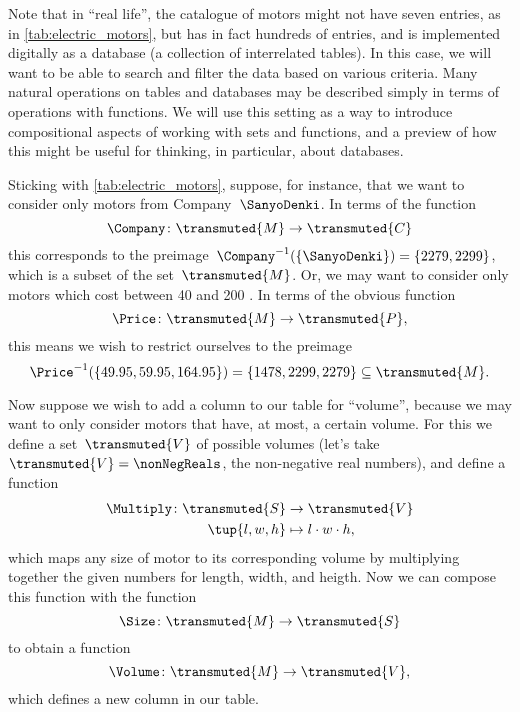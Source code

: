 Note that in ``real life'', the catalogue of motors might not have seven entries, as in \cref{tab:electric_motors}, but has in fact hundreds of entries, and is implemented digitally as a database (a collection of interrelated tables). In this case, we will want to be able to search and filter the data based on various criteria. Many natural operations on tables and databases may be described simply in terms of operations with functions. We will use this setting as a way to introduce compositional aspects of working with sets and functions, and a preview of how this might be useful for thinking, in particular, about databases.

Sticking with \cref{tab:electric_motors}, suppose, for instance, that we want to consider only motors from Company~$\SanyoDenki$. In terms of the function
\begin{equation*}
  \Company\colon \transmuted{M} \to \transmuted{C}
\end{equation*}
this corresponds to the preimage~$\Company^{-1}(\{\SanyoDenki \}) = \{2279, 2299\}$, which is a subset of the set~$\transmuted{M}$. Or, we may want to consider only motors which cost between 40 and 200 \USD. In terms of the obvious function
\begin{equation*}
  \Price\colon \transmuted{M} \to \transmuted{P},
\end{equation*}
this means we wish to restrict ourselves to the preimage
\begin{equation*}
  \Price^{-1}(\{ 49.95, 59.95, 164.95\}) = \{ 1478, 2299, 2279 \} \subseteq \transmuted{M}.
\end{equation*}

Now suppose we wish to add a column to our table for ``volume'', because we may want to only consider motors that have, at most, a certain volume.
For this we define a set~$\transmuted{V}$ of possible volumes (let's take~$\transmuted{V} = \nonNegReals$, the non-negative real numbers), and define a function
\begin{equation*}
  \begin{aligned}
    \Multiply \colon \transmuted{S} &\to \transmuted{V}\\
    \tup{l, w, h} &\mapsto l \cdot w \cdot h,
  \end{aligned}
\end{equation*}
which maps any size of motor to its corresponding volume by multiplying together the given numbers for length, width, and heigth. Now we can compose this function with the function
\begin{equation*}
  \Size \colon \transmuted{M} \to \transmuted{S}
\end{equation*}
to obtain a function
\begin{equation*}
  \Volume\colon \transmuted{M} \to \transmuted{V},
\end{equation*}
which defines a new column in our table.


